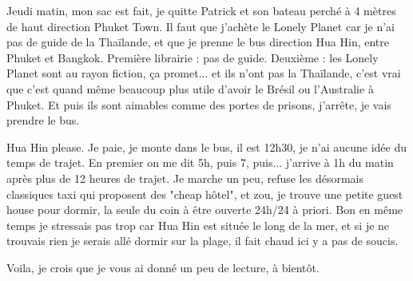 \begin{multicols}{2}
Jeudi matin, mon sac est fait, je quitte Patrick et son bateau perché à 4 mètres de haut direction Phuket Town. Il faut que j'achète le Lonely Planet car je n'ai pas de guide de la Thaïlande, et que je prenne le bus direction Hua Hin, entre Phuket et Bangkok. Première librairie : pas de guide. Deuxième : les Lonely Planet sont au rayon fiction, ça promet... et ils n'ont pas la Thaïlande, c'est vrai que c'est quand même beaucoup plus utile d'avoir le Brésil ou l'Australie à Phuket. Et puis ils sont aimables comme des portes de prisons, j'arrête, je vais prendre le bus.

Hua Hin please. Je paie, je monte dans le bus, il est 12h30, je n'ai aucune idée du temps de trajet. En premier on me dit 5h, puis 7, puis... j'arrive à 1h du matin après plus de 12 heures de trajet. Je marche un peu, refuse les désormais classiques taxi qui proposent des "cheap hôtel", et zou, je trouve une petite guest house pour dormir, la seule du coin à être ouverte 24h/24 à priori. Bon en même temps je stressais pas trop car Hua Hin est située le long de la mer, et si je ne trouvais rien je serais allé dormir sur la plage, il fait chaud ici y a pas de soucis.

Voila, je crois que je vous ai donné un peu de lecture, à bientôt.

\end{multicols}


